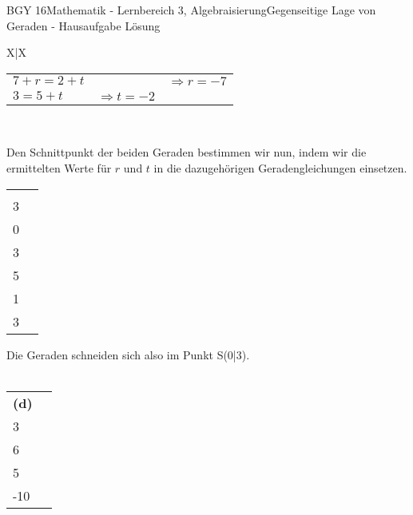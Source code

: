 \documentclass[oneside,openany,headings=optiontotoc,11pt,numbers=noenddot]{scrreprt}
\begin{document}
\begin{worksheet}{BGY 16}{Mathematik - Lernbereich 3, Algebraisierung}{Gegenseitige Lage von Geraden - Hausaufgabe Lösung}
\begin{framed}
\begin{tabularx}{\textwidth}{X|X}
\begin{tabular}{lll}
					\( 7 + r = 2 + t\)& & \(\Rightarrow r = -7\)\\
					\(3 = 5 + t\) & \(\Rightarrow t = -2\)
				\end{tabular}
			\end{tabularx}\\
			\par\noindent
			Den Schnittpunkt der beiden Geraden bestimmen wir nun, indem wir die ermittelten Werte für \(r\) und \(t\) in die dazugehörigen Geradengleichungen einsetzen.\\
			\par\noindent
			\begin{tabularx}{\textwidth}{XX}
				\(\left(\begin{array}{c}7\\3\end{array}\right) - 7\left(\begin{array}{c}1\\0\end{array}\right) = \left(\begin{array}{c}0\\3\end{array}\right)\) & \(\left(\begin{array}{c}2\\5\end{array}\right) - 2\left(\begin{array}{c}1\\1\end{array}\right) = \left(\begin{array}{c}0\\3\end{array}\right)\)
			\end{tabularx}
			\par\noindent			
			Die Geraden schneiden sich also im Punkt S(0|3).\\
			\noindent
			\hdashrule[0.5ex][x]{\textwidth}{0.1mm}{8mm 2pt}\\
			\par\noindent
			\begin{tabularx}{\textwidth}{XX}
				\textbf{(d)} \(g: \vec{x} = \left(\begin{array}{c}1\\3\end{array}\right) + r\left(\begin{array}{c}3\\6\end{array}\right)\) & \(h: \vec{x} = \left(\begin{array}{c}2\\5\end{array}\right) + t\left(\begin{array}{c}-5\\-10\end{array}\right)\)

\end{tabularx}
\end{framed}
\end{worksheet}
\end{document}

